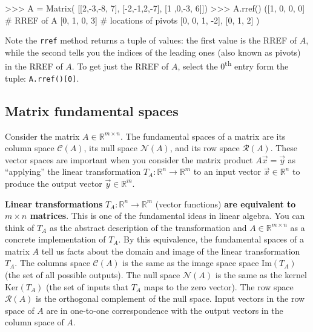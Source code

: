 \small
\begin{verbatimtab}
>>> A = Matrix( [[2,-3,-8, 7],
                 [-2,-1,2,-7],
                 [1 ,0,-3, 6]])
>>> A.rref()
([1, 0, 0,  0]  # RREF of A
 [0, 1, 0,  3]                    # locations of pivots
 [0, 0, 1, -2],                   [0, 1, 2]              )
\end{verbatimtab}
\normalsize

\noindent
Note the \texttt{rref} method returns a tuple of values:
the first value is the RREF of $A$,
while the second tells you the indices of the leading ones (also known as pivots) in the RREF of $A$.
To get just the RREF of $A$, select the $0$\textsuperscript{th} entry form the tuple: \texttt{A.rref()[0]}.

%

\vspace{-2mm}


\subsection{Matrix fundamental spaces}
\label{matrices:matrix_fundamental_spaces}

Consider the matrix $A \in \mathbb{R}^{m\times n}$.
The fundamental spaces of a matrix are its column space $\mathcal{C}(A)$, 
its null space $\mathcal{N}(A)$,
and its row space $\mathcal{R}(A)$.
These vector spaces are important when you consider the matrix product
$A\vec{x}=\vec{y}$ as ``applying'' the linear transformation $T_A:\mathbb{R}^n \to \mathbb{R}^m$
to an input vector $\vec{x} \in \mathbb{R}^n$ to produce the output vector $\vec{y} \in \mathbb{R}^m$.

\textbf{Linear transformations} $T_A:\mathbb{R}^n \to \mathbb{R}^m$ (vector functions)
\textbf{are equivalent to $m\times n$ matrices}.
This is one of the fundamental ideas in linear algebra.
You can think of $T_A$ as the abstract description of the transformation 
and $A \in \mathbb{R}^{m\times n}$ as a concrete implementation of $T_A$.
By this equivalence, 
the fundamental spaces of a matrix $A$
tell us facts about the domain and image of the linear transformation $T_A$.
The columns space $\mathcal{C}(A)$ is the same as the image space space $\textrm{Im}(T_A)$ (the set of all possible outputs).
The null space $\mathcal{N}(A)$ is the same as the kernel $\textrm{Ker}(T_A)$ (the set of inputs that $T_A$ maps to the zero vector).
The row space $\mathcal{R}(A)$ is the orthogonal complement of the null space.
Input vectors in the row space of $A$ are in one-to-one correspondence with the output vectors in the column space of $A$.

